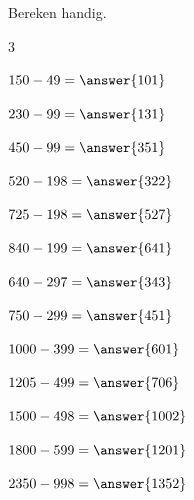 \documentclass{ximera}
\begin{document}
\begin{oefening}{\oefB\ESS}

Bereken handig.

\begin{multicols}{3}

\begin{question} \(150-49=\answer{101}\) \end{question}

\begin{question} \(230-99=\answer{131}\) \end{question}

\begin{question} \(450-99=\answer{351}\) \end{question}

\begin{question} \(520-198=\answer{322}\) \end{question}

\begin{question} \(725-198=\answer{527}\) \end{question}

\begin{question} \(840-199=\answer{641}\) \end{question}

\begin{question} \(640-297=\answer{343}\) \end{question}

\begin{question} \(750-299=\answer{451}\) \end{question}

\begin{question} \(1000-399=\answer{601}\) \end{question}

\begin{question} \(1205-499=\answer{706}\) \end{question}

\begin{question} \(1500-498=\answer{1002}\) \end{question}

\begin{question} \(1800-599=\answer{1201}\) \end{question}

\begin{question} \(2350-998=\answer{1352}\) \end{question}


\end{multicols}
\end{oefening}
\end{document}
